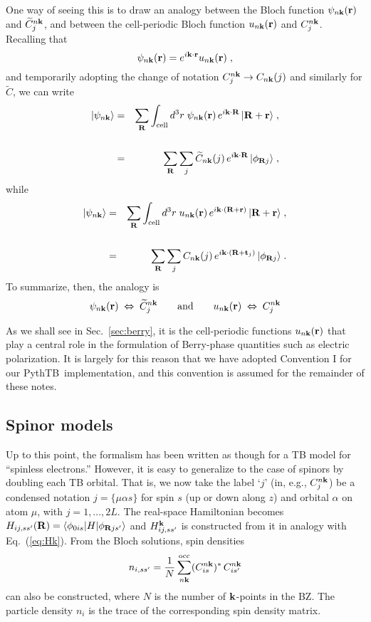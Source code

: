 \documentclass[11pt]{article}
\numberwithin{equation}{section} %
\def\nn{\nonumber\\}
\def\bea{\begin{eqnarray}}
\def\eea{\end{eqnarray}}
\def\beq{\begin{equation}}
\def\eeq{\end{equation}}
\newcommand{\equ}[1]{Eq.~(\ref{eq:#1})}
\def\PythTB{{\sc PythTB}}
\def\ket#1{\vert #1 \rangle}
\def\bra#1{\langle #1 \vert}
\def\me#1#2#3{\bra{#1}#2\ket{#3}}
\def\k{{\bf k}}
\def\r{{\bf r}}
\def\R{{\bf R}}
\def\t{{\bf t}}
\def\t{{\bf t}}
\def\Ct{{\widetilde{C}}}
\begin{document}
One way of seeing this is to draw an analogy between the
Bloch function $\psi_{n\k}(\r)$ and
$\Ct_j^{n\k}$, and between the cell-periodic Bloch function
$u_{n\k}(\r)$ and $C_j^{n\k}$.
Recalling that
%
\beq
\psi_{n\k}(\r)=e^{i\k\cdot\r}u_{n\k}(\r) \;,
\label{eq:Bloch}
\eeq
%
and temporarily adopting the change of notation $C^{n\k}_j
\rightarrow C_{n\k}(j)$ and similarly for $\Ct$, we can write
%
\bea
\ket{\psi_{n\k}}&=&\sum_\R\int_\textrm{cell} d^3r\;\psi_{n\k}(\r)\,
e^{i\k\cdot\R}\,\ket{\R+\r} \;,\nn\\
                &=&\sum_\R\sum_j \Ct_{n\k}(j)\,
e^{i\k\cdot\R}\,\ket{\phi_{\R j}} \;,
\eea
%
while
%
\bea
\ket{\psi_{n\k}}&=&\sum_\R\int_\textrm{cell} d^3r\;u_{n\k}(\r)\,
e^{i\k\cdot(\R+\r)}\,\ket{\R+\r} \;,\nn\\
                &=&\sum_\R\sum_j C_{n\k}(j)\,
e^{i\k\cdot(\R+\t_j)}\,\ket{\phi_{\R j}} \;.
\eea
%
To summarize, then, the analogy is
%
\[
\psi_{n\k}(\r)\;\Leftrightarrow\;\Ct^{n\k}_j
\qquad\textrm{and}\qquad
u_{n\k}(\r)\;\Leftrightarrow\;C^{n\k}_j
\]

As we shall see in Sec.~\ref{sec:berry}, it is the cell-periodic
functions $u_{n\k}(\r)$ that play a central role in the formulation
of Berry-phase quantities such as electric polarization.  It is
largely for this reason that we have adopted Convention I for our
\PythTB\ implementation, and this convention is assumed for the remainder
of these notes.

\subsection{Spinor models}
\label{sec:spinors}

Up to this point, the formalism has been written as though for
a TB model for ``spinless electrons.'' However, it is easy to
generalize to the case of spinors by doubling each TB orbital.
That is, we now take the label `$j$' (in, e.g., $C^{n\k}_j$)
be a condensed notation $j=\{\mu\alpha s\}$ for spin $s$ (up or
down along $z$) and orbital $\alpha$ on atom $\mu$, with
$j=1,...,2L$.  The real-space Hamiltonian becomes
$H_{ij,ss'}(\R)=\me{\phi_{0is}}{H}{\phi_{\R js'}}$
and $H_{ij,ss'}^\k$ is constructed from it in analogy
with \equ{Hk}.  From the Bloch solutions, spin densities
%
\beq
n_{i,ss'}=\frac{1}{N}\sum_{n\k}^\textrm{occ}
(C^{n\k}_{is})^*\, C^{n\k}_{is'}
\eeq
%
can also be constructed, where $N$ is the number of $\k$-points
in the BZ. The particle density $n_i$ is the trace of the
corresponding spin density matrix.
\end{document}
